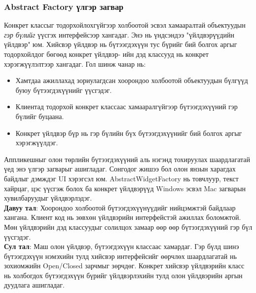 \subsubsection{Abstract Factory үлгэр загвар}
\quad \quad Конкрет классыг тодорхойлохгүйгээр холбоотой эсвэл хамааралтай объектуудын \textit{гэр бүлийг} үүсгэх интерфейсээр хангадаг. Энэ нь үндсэндээ "үйлдвэрүүдийн үйлдвэр" юм. Хийсвэр үйлдвэр нь бүтээгдэхүүн тус бүрийг бий болгох аргыг тодорхойлдог бөгөөд конкрет үйлдвэр- ийн дэд классууд нь конкрет хэрэгжүүлэлтээр хангадаг. Гол шинж чанар нь:
\begin{itemize}
	\item Хамтдаа ажиллахад зориулагдсан хоорондоо холбоотой объектуудын бүлгүүд буюу бүтээгдэхүүнийг үүсгэдэг.
	\item Клиентад тодорхой конкрет классаас хамааралгүйгээр бүтээгдэхүүний гэр бүлийг буцаана.
	\item Конкрет үйлдвэр бүр нь гэр бүлийн бүх бүтээгдэхүүнийг бий болгох аргыг хэрэгжүүлдэг.
\end{itemize}
Аппликешныг олон төрлийн бүтээгдэхүүний аль нэгэнд тохируулах шаардлагатай үед энэ үлгэр загварыг ашигладаг. Сонгодог жишээ бол олон янзын харагдах байдлыг дэмждэг UI хэрэгсэл юм. AbstractWidgetFactory нь товчлуур, текст хайрцаг, цэс үүсгэж болох ба конкрет үйлдвэрүүд Windows эсвэл Mac загварын хувилбаруудыг үйлдвэрлэдэг.\\
\textbf{Давуу тал}: Хоорондоо холбоотой бүтээгдэхүүнүүдийг нийцэмжтэй байдлаар хангана. Клиент код нь зөвхөн үйлдвэрийн интерфейстэй ажиллах боломжтой. Мөн үйлдвэрийн дэд классуудыг солилцох замаар өөр өөр бүтээгдэхүүний гэр бүл үүсгэдэг. \\
\textbf{Сул тал}: Маш олон үйлдвэр, бүтээгдэхүүн классаас хамардаг. Гэр бүлд шинэ бүтээгдэхүүн нэмэхийн тулд хийсвэр интерфейсийг өөрчлөх шаардлагатай нь зохиомжийн Open/Closed зарчмыг зөрчдөг. Конкрет хийсвэр үйлдвэрийн класс нь холбогдох бүтээгдэхүүн бүрийг үйлдвэрлэхийн тулд олон үйлдвэрийн аргын дуудлага ашигладаг.


